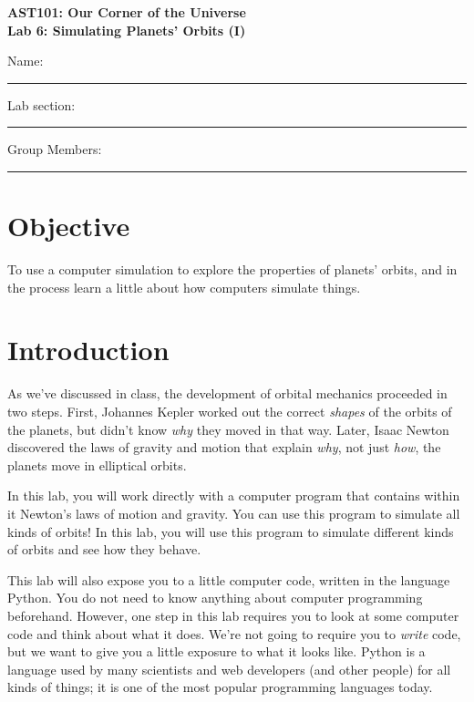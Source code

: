 \documentclass[11pt]{article}
\begin{document}
\begin{center}
\textbf{\Large
AST101: Our Corner of the Universe \\
\vspace*{0.1cm}
Lab 6: Simulating Planets' Orbits (I)
}
\end{center}

\vspace*{0.5cm}

{\Large Name:}\vspace*{0.5cm}\\\hrule
{\Large Lab section:}\vspace*{0.5cm}\\\hrule
{\Large Group Members:}\vspace*{0.5cm}\\\hrule
\vspace*{0.5cm}


\section{Objective}

To use a computer simulation to explore the properties of planets' orbits, and in the process learn a little about how computers simulate things.

\section{Introduction}

As we've discussed in class, the development of orbital mechanics proceeded in two steps. First, Johannes Kepler worked out the correct {\it shapes} of the orbits of the planets, but didn't know {\it why} they moved in that way. Later, Isaac Newton discovered the laws of gravity and motion that explain {\it why}, not just {\it how}, the planets move in elliptical orbits.

In this lab, you will work directly with a computer program that contains within it Newton's laws of motion and gravity. You can use this program to simulate all kinds of orbits! In this lab, you will use this program to simulate different kinds of orbits and see how they behave.

This lab will also expose you to a little computer code, written in the language Python. You do not need to know anything about computer programming beforehand. However, one step in this lab requires you to look at some computer code and think about what it does. We're not going to require you to {\it write} code, but we want to give you a little exposure to what it looks like. Python is a language used by many scientists and web developers (and other people) for all kinds of things; it is one of the most popular programming languages today.
\end{document}

